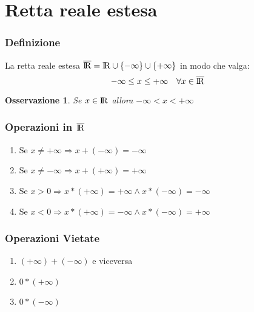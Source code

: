 \documentclass[12pt, a4paper]{article}
\theoremstyle{break}
\newtheorem{observation}{Osservazione}[subsection]
\newcommand\R{{\rm I\!R}}
\begin{document}
    \section{Retta reale estesa}
    \subsubsection{Definizione}
    La retta reale estesa $\overline{\R} = \R \cup \{-\infty\}\cup\{+\infty\}$ in modo che valga:
    \[-\infty \leq x \leq +\infty\quad\forall x\in\overline{\R}\]
    \begin{observation}
        Se $x\in\R$ allora $-\infty<x<+\infty$
    \end{observation}
    \subsubsection{Operazioni in $\overline{\R}$}
    \begin{enumerate}
        \item Se $x\neq+\infty\Rightarrow x+(-\infty) = -\infty$
        \item Se $x\neq-\infty\Rightarrow x+(+\infty) = +\infty$
        \item Se $x > 0\Rightarrow x*(+\infty) = +\infty \wedge x*(-\infty) = -\infty$
        \item Se $x < 0\Rightarrow x*(+\infty) = -\infty \wedge x*(-\infty) = +\infty$
    \end{enumerate}
    \subsubsection{Operazioni Vietate}
    \begin{enumerate}
        \color{red}
        \item $(+\infty) + (-\infty)$ e viceversa
        \item $0*(+\infty)$
        \item $0*(-\infty)$ 
    \end{enumerate}
\end{document}
